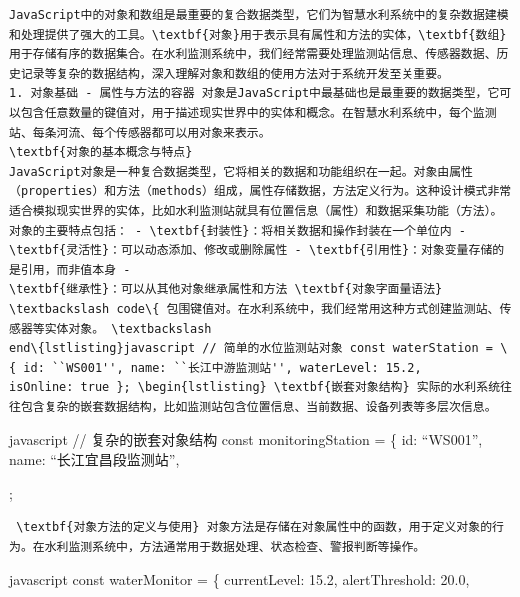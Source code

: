 {{{{{{{{{{{{\begin{lstlisting}
JavaScript中的对象和数组是最重要的复合数据类型，它们为智慧水利系统中的复杂数据建模和处理提供了强大的工具。\textbf{对象}用于表示具有属性和方法的实体，\textbf{数组}用于存储有序的数据集合。在水利监测系统中，我们经常需要处理监测站信息、传感器数据、历史记录等复杂的数据结构，深入理解对象和数组的使用方法对于系统开发至关重要。
1. 对象基础 - 属性与方法的容器 对象是JavaScript中最基础也是最重要的数据类型，它可以包含任意数量的键值对，用于描述现实世界中的实体和概念。在智慧水利系统中，每个监测站、每条河流、每个传感器都可以用对象来表示。
\textbf{对象的基本概念与特点}
JavaScript对象是一种复合数据类型，它将相关的数据和功能组织在一起。对象由属性（properties）和方法（methods）组成，属性存储数据，方法定义行为。这种设计模式非常适合模拟现实世界的实体，比如水利监测站就具有位置信息（属性）和数据采集功能（方法）。
对象的主要特点包括： - \textbf{封装性}：将相关数据和操作封装在一个单位内 - \textbf{灵活性}：可以动态添加、修改或删除属性 - \textbf{引用性}：对象变量存储的是引用，而非值本身 -
\textbf{继承性}：可以从其他对象继承属性和方法 \textbf{对象字面量语法} \textbackslash code\{ 包围键值对。在水利系统中，我们经常用这种方式创建监测站、传感器等实体对象。 \textbackslash
end\{lstlisting}javascript // 简单的水位监测站对象 const waterStation = \{ id: ``WS001'', name: ``长江中游监测站'', waterLevel: 15.2,
isOnline: true }; \begin{lstlisting} \textbf{嵌套对象结构} 实际的水利系统往往包含复杂的嵌套数据结构，比如监测站包含位置信息、当前数据、设备列表等多层次信息。 \end{lstlisting}
javascript // 复杂的嵌套对象结构 const monitoringStation = \{ id: ``WS001'', name: ``长江宜昌段监测站'', \begin{quote}
 
\end{quote}
; \begin{lstlisting} \textbf{对象方法的定义与使用} 对象方法是存储在对象属性中的函数，用于定义对象的行为。在水利监测系统中，方法通常用于数据处理、状态检查、警报判断等操作。 \end{lstlisting}
javascript const waterMonitor = \{ currentLevel: 15.2, alertThreshold: 20.0, \begin{quote}
 

\end{quote}}}}}}}}}}}}}
